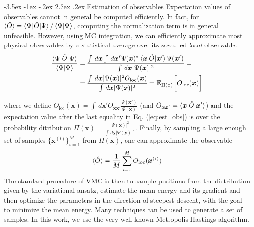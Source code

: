 \documentclass[a4paper, 12pt, oneside]{article}
\makeatletter
\renewcommand{\subsection}{\@startsection{subsection}{1}{\z@}%
             {-3.5ex \@plus-1ex \@minus-.2ex}%
             {2.3ex \@plus.2ex}%
             {\normalfont\normalsize\bfseries}}
\makeatother
\begin{document}
\subsection{Estimation of observables}
Expectation values of observables cannot in general 
be computed efficiently. In fact, for $\braket{\hat{O}} = \braket{\Psi|\hat{O}|\Psi}/\braket{\Psi|\Psi}$, 
computing the normalization term is in general unfeasible. However, using MC integration, we can efficiently 
approximate most physical observables by a statistical average over its so-called \textit{local} observable:
\begin{equation}\label{eq:est_obs}
    \begin{split}
    \dfrac{\braket{\Psi|\hat{O}|\Psi}}{\braket{\Psi|\Psi}} &= 
    \dfrac{\int \,d\bm{x} \int \,d\bm{x'}\Psi(\bm{x})^*\braket{\bm{x}|\hat{O}|\bm{x}'}\Psi(\bm{x}')}{\int \,d\bm{x} |\Psi(\bm{x})|^2} = \\
    &= \dfrac{\int \,d\bm{x} |\Psi(\bm{x})|^2 O_{\text{loc}}(\bm{x})}{\int \,d\bm{x} |\Psi(\bm{x})|^2} = \mathbb{E}_{\Pi(\bm{x})}\biggr[O_{\text{loc}}(\bm{x})\biggr]
    \end{split}
\end{equation}

where we define $O_{\text{loc}}(\bm{x}) = \int \,d\bm{x'} O_{\bm{x}\bm{x}'} \frac{\Psi(\bm{x}')}{\Psi(\bm{x})}$ 
(and $O_{\bm{x}\bm{x}'} = \braket{\bm{x}|\hat{O}|\bm{x}'}$) and the expectation value after the last equality 
in Eq. (\ref{eq:est_obs}) is over the probability ditribution 
$\Pi(\bm{x}) = \frac{|\Psi(\bm{x})|^2}{\int \,d\bm{y} |\Psi(\bm{y})|^2}$. Finally,
by sampling a large enough set of samples $\{\bm{x}^{(i)}\}_{i=1}^M$ from $\Pi(\bm{x})$, one can 
approximate the observable:
\begin{equation}
    \braket{\hat{O}} = \frac{1}{M}\sum_{i=1}^M O_{\text{loc}}(\bm{x}^{(i)})
\end{equation}
The standard procedure of VMC is then to sample positions from the distribution given by the variational 
ansatz, estimate the mean energy and its gradient and then optimize the parameters in the direction of steepest 
descent, with the goal to minimize the mean energy. Many techniques can be used to generate a set of samples. In 
this work, we use the very well-known Metropolis-Hastings algorithm.
\end{document}
